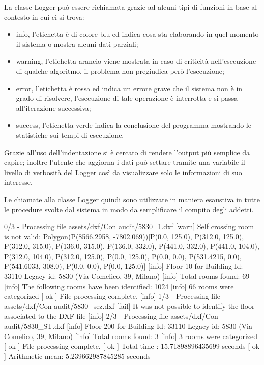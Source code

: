 \documentclass[12pt]{report}
\begin{document}
La classe Logger può essere richiamata grazie ad alcuni tipi di funzioni in base al contesto in cui ci si trova:
\begin{itemize}
\item info, l'etichetta è di colore blu ed indica cosa sta elaborando in quel momento il sistema o mostra alcuni dati parziali;
\item warning, l'etichetta arancio viene mostrata in caso di criticità nell'esecuzione di qualche algoritmo, il problema non pregiudica però l'esecuzione;
\item error, l'etichetta è rossa ed indica un errore grave che il sistema non è in grado di risolvere, l'esecuzione di tale operazione è interrotta e si passa all'iterazione successiva;
\item success, l'etichetta verde indica la conclusione del programma mostrando le statistiche sui tempi di esecuzione.
\end{itemize}    

\vspace{5mm} %

Grazie all'uso dell'indentazione si è cercato di rendere l'output più semplice da capire; inoltre l'utente che aggiorna i dati può settare tramite una variabile il livello di verbosità del Logger così da visualizzare solo le informazioni di suo interesse.

Le chiamate alla classe Logger quindi sono utilizzate in maniera esaustiva in tutte le procedure svolte dal sistema in modo da semplificare il compito degli addetti.

\newpage

\begin{outputl}[title=Esempio di output del Logger nel processamento di file DXF, frame=single]
[info] 0/3 - Processing file assets/dxf/Con audit/5830_1.dxf
       [warn] Self crossing room is not valid: 
       Polygon(P(8566.2958, -7802.069))[P(0.0, 125.0), 
       	P(312.0, 125.0), P(312.0, 315.0), P(136.0, 315.0), 
       	P(136.0, 332.0), P(441.0, 332.0), P(441.0, 104.0), 
       	P(312.0, 104.0), P(312.0, 125.0), P(0.0, 125.0), 
       	P(0.0, 0.0), P(531.4215, 0.0), P(541.6033, 308.0), 
       	P(0.0, 0.0), P(0.0, 125.0)]
       [info] Floor 10 for Building Id: 33110 Legacy id: 
       	5830 (Via Comelico, 39, Milano)
              [info] Total rooms found: 69
              [info] The following rooms have 
              		been identified: 1024
              [info] 66 rooms were categorized
       [ ok ] File processing complete.
[info] 1/3 - Processing file assets/dxf/Con audit/5830_sez.dxf
       [fail] It was not possible to identify the floor 
       	associated to the DXF file
[info] 2/3 - Processing file assets/dxf/Con audit/5830_ST.dxf
       [info] Floor 200 for Building Id: 33110 Legacy id: 
       	5830 (Via Comelico, 39, Milano)
              [info] Total rooms found: 3
              [info] 3 rooms were categorized
       [ ok ] File processing complete.
[ ok ] Total time     : 15.71898896435699 seconds
[ ok ] Arithmetic mean: 5.239662987845285 seconds

\end{outputl}
\end{document}
